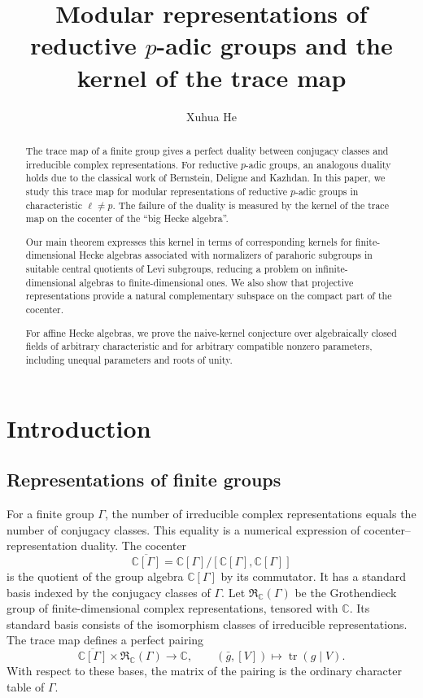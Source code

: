 \documentclass[11pt,letterpaper]{amsart}
\title[Mod-$\ell$ representations of $p$-adic groups]{Modular representations of reductive $p$-adic groups and the kernel of the trace map}
\author[Xuhua He]{Xuhua He}
\theoremstyle{definition}
\numberwithin{equation}{section}
\numberwithin{theorem}{section}
\newcommand{\CC}{\mathbb C}
\newcommand{\cR}{\mathfrak R}
\begin{document}
\begin{abstract}
The trace map of a finite group gives a perfect duality between conjugacy classes and irreducible complex representations. For reductive $p$-adic groups, an analogous duality holds due to the classical work of Bernstein, Deligne and Kazhdan. In this paper, we study this trace map for modular representations of
reductive $p$-adic groups in characteristic $\ell\ne p$. The failure of the duality is measured by the kernel of the trace map on the cocenter of the ``big Hecke algebra''. 

Our main theorem expresses this kernel in terms of corresponding kernels for finite-dimensional Hecke algebras associated with normalizers of parahoric subgroups in suitable central quotients of Levi subgroups, reducing a problem on infinite-dimensional algebras to finite-dimensional ones. We also show that projective representations provide a natural complementary subspace on the compact part of the cocenter.

For affine Hecke algebras, we prove the naive-kernel conjecture over algebraically closed fields of arbitrary characteristic and for arbitrary compatible nonzero parameters, including unequal parameters and roots of unity.
\end{abstract}



\maketitle


\section*{Introduction}

\subsection{Representations of finite groups}
For a finite group $\Gamma$, the number of irreducible complex
representations equals the number of conjugacy classes.
This equality is a numerical expression of
cocenter--representation duality. The cocenter
\[
 \overline{\CC[\Gamma]}
   =\CC[\Gamma]/[\CC[\Gamma],\CC[\Gamma]]
\]
is the quotient of the group algebra $\CC[\Gamma]$ by its commutator. It has
a standard basis indexed by the conjugacy classes of $\Gamma$.
Let $\cR_\CC(\Gamma)$ be the Grothendieck group of
finite-dimensional complex representations, tensored with
$\CC$. Its standard basis consists of the isomorphism classes of irreducible
representations. The trace map defines a perfect pairing
\[
 \overline{\CC[\Gamma]}\times\cR_\CC(\Gamma)
 \longrightarrow\CC,
 \qquad
 (\bar g,[V])\longmapsto\operatorname{tr}(g\mid V).
\]
With respect to these bases, the matrix of the pairing
is the ordinary character table of $\Gamma$.
\end{document}
